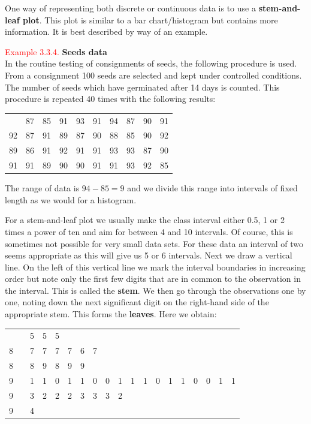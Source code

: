\documentclass[
]{book}
\begin{document}
One way of representing both discrete or continuous data is to use a
\textbf{stem-and-leaf plot}. This plot is similar to a bar chart/histogram
but contains more information. It is best described by way of an
example.

\leavevmode{}%
\textcolor{red}{Example 3.3.4.}
{ \textbf{Seeds data} }\\
In the routine testing of consignments of seeds,
the following procedure is used. From a consignment 100 seeds are
selected and kept under controlled conditions. The number of seeds which
have germinated after 14 days is counted. This procedure is repeated 40
times with the following results:

\begin{longtable}[]{@{}cccccccccc@{}}
\toprule\noalign{}
\endhead
\bottomrule\noalign{}
\endlastfoot
88 & 87 & 85 & 91 & 93 & 91 & 94 & 87 & 90 & 91 \\
92 & 87 & 91 & 89 & 87 & 90 & 88 & 85 & 90 & 92 \\
89 & 86 & 91 & 92 & 91 & 91 & 93 & 93 & 87 & 90 \\
91 & 91 & 89 & 90 & 90 & 91 & 91 & 93 & 92 & 85 \\
\end{longtable}

The range of data is \(94 - 85 = 9\) and we divide this range into
intervals of fixed length as we would for a histogram.

For a stem-and-leaf plot we usually make the class interval either 0.5,
1 or 2 times a power of ten and aim for between 4 and 10 intervals. Of
course, this is sometimes not possible for very small data sets. For
these data an interval of two seems appropriate as this will give us 5
or 6 intervals. Next we draw a vertical line. On the left of this
vertical line we mark the interval boundaries in increasing order but
note only the first few digits that are in common to the observation in
the interval. This is called the \textbf{stem}. We then go through the
observations one by one, noting down the next significant digit on the
right-hand side of the appropriate stem. This forms the \textbf{leaves}. Here
we obtain:

\begin{longtable}[]{@{}lllllllllllllllllll@{}}
\toprule\noalign{}
\endhead
\bottomrule\noalign{}
\endlastfoot
8 & \textbar{} & 5 & 5 & 5 & & & & & & & & & & & & & & \\
8 & \textbar{} & 7 & 7 & 7 & 7 & 6 & 7 & & & & & & & & & & & \\
8 & \textbar{} & 8 & 9 & 8 & 9 & 9 & & & & & & & & & & & & \\
9 & \textbar{} & 1 & 1 & 0 & 1 & 1 & 0 & 0 & 1 & 1 & 1 & 0 & 1 & 1 & 0 & 0 & 1 & 1 \\
9 & \textbar{} & 3 & 2 & 2 & 2 & 3 & 3 & 3 & 2 & & & & & & & & & \\
9 & \textbar{} & 4 & & & & & & & & & & & & & & & & \\
\end{longtable}
\end{document}

